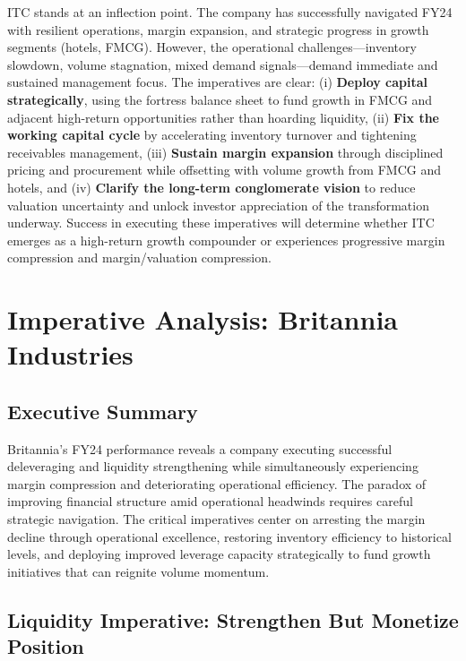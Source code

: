 \documentclass[12pt, a4paper]{report}
\begin{document}
ITC stands at an inflection point. The company has successfully navigated FY24 with resilient operations, margin expansion, and strategic progress in growth segments (hotels, FMCG). However, the operational challenges—inventory slowdown, volume stagnation, mixed demand signals—demand immediate and sustained management focus. The imperatives are clear: (i) \textbf{Deploy capital strategically}, using the fortress balance sheet to fund growth in FMCG and adjacent high-return opportunities rather than hoarding liquidity, (ii) \textbf{Fix the working capital cycle} by accelerating inventory turnover and tightening receivables management, (iii) \textbf{Sustain margin expansion} through disciplined pricing and procurement while offsetting with volume growth from FMCG and hotels, and (iv) \textbf{Clarify the long-term conglomerate vision} to reduce valuation uncertainty and unlock investor appreciation of the transformation underway. Success in executing these imperatives will determine whether ITC emerges as a high-return growth compounder or experiences progressive margin compression and margin/valuation compression.

\newpage


\section{Imperative Analysis: Britannia Industries}

\subsection{Executive Summary}

Britannia's FY24 performance reveals a company executing successful deleveraging and liquidity strengthening while simultaneously experiencing margin compression and deteriorating operational efficiency. The paradox of improving financial structure amid operational headwinds requires careful strategic navigation. The critical imperatives center on arresting the margin decline through operational excellence, restoring inventory efficiency to historical levels, and deploying improved leverage capacity strategically to fund growth initiatives that can reignite volume momentum.

\subsection{Liquidity Imperative: Strengthen But Monetize Position}
\end{document}
